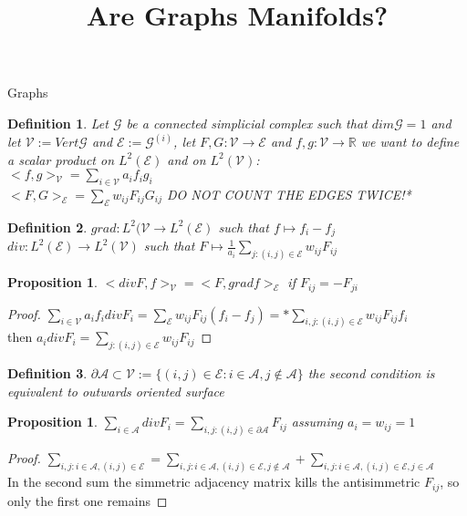 \documentclass{article}
\title{Are Graphs Manifolds?}
\author{}
\date{}
\newtheorem{prop}[thm]{Proposition}
\newtheorem{defn}{Definition}[section]
\newcommand{\R}{\mathbb{R}}
\begin{document}
    \maketitle
    \begin{section}{Graphs}
    \begin{defn}
        Let $\mathcal{G}$ be a connected simplicial complex such that $dim\mathcal{G}=1$ and let $\mathcal{V}:=Vert\mathcal{G}$
	and $\mathcal{E}:=\mathcal{G}^{(i)}$, let $F,G:\mathcal{V} \to \mathcal{E}$ and $f,g:\mathcal{V} \to \R$ we want to define
	a scalar product on $L^2(\mathcal{E})$ and on $L^2(\mathcal{V})$:\\
	$<f,g>_{\mathcal{V}}=\sum_{i \in \mathcal{V}}a_if_ig_i$\\
	$<F,G>_{\mathcal{E}}=\sum_{\mathcal{E}}w_{ij}F_{ij}G_{ij}$ DO NOT COUNT THE EDGES TWICE!*
    \end{defn}
    \begin{defn}
        $grad: L^2(\mathcal{V} \to L^2(\mathcal{E})$ such that $f \mapsto f_i-f_j$\\
	$div: L^2(\mathcal{E}) \to L^2(\mathcal{V})$ such that $F \mapsto \frac{1}{a_i}\sum_{j:(i,j)\in\mathcal{E}}w_{ij}F_{ij}$
    \end{defn}
    \begin{prop}
        $<divF,f>_{\mathcal{V}}=<F,gradf>_{\mathcal{E}}$ if $F_{ij}=-F_{ji}$
    \end{prop}
    \begin{proof}
        $\sum_{i \in \mathcal{V}}a_if_idivF_i=\sum_{\mathcal{E}}w_{ij}F_{ij}(f_i-f_j)
	=*\sum_{i,j:(i,j)\in\mathcal{E}}w_{ij}F_{ij}f_i$\\
	then $a_idivF_i=\sum_{j:(i,j)\in\mathcal{E}}w_{ij}F_{ij}$
    \end{proof}
    \begin{defn}
        $\partial\mathcal{A \subset V}:=\{(i,j)\in\mathcal{E}:i\in{\mathcal{A}}, j\notin{\mathcal{A}}\}$ 
	the second condition is equivalent to outwards oriented surface
    \end{defn}
    \begin{prop}
        $\sum_{i\in\mathcal{A}}divF_i=\sum_{i,j:(i,j)\in\partial\mathcal{A}}F_{ij}$ assuming $a_i=w_{ij}=1$
    \end{prop}
    \begin{proof}
        $\sum_{i,j:i\in\mathcal{A},(i,j)\in\mathcal{E}}=\sum_{i,j:i\in\mathcal{A},(i,j)\in\mathcal{E},j\notin\mathcal{A}}
	+\sum_{i,j:i\in\mathcal{A},(i,j)\in\mathcal{E},j\in\mathcal{A}}$\\
	In the second sum the simmetric adjacency matrix kills the antisimmetric $F_{ij}$, so only the first one remains
    \end{proof}
    \end{section}
\end{document}

